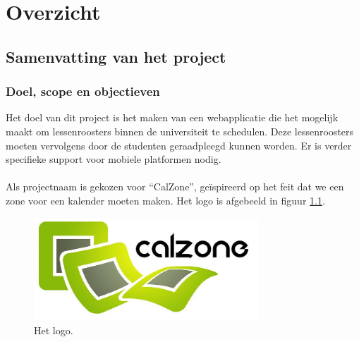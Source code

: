 \chapter{Overzicht}
\section{Samenvatting van het project}
\subsection{Doel, scope en objectieven}
Het doel van dit project is het maken van een webapplicatie die het mogelijk maakt om lessenroosters binnen de universiteit te schedulen. Deze lessenroosters moeten vervolgens door de studenten geraadpleegd kunnen worden. Er is verder specifieke support voor mobiele platformen nodig.
\\
\\
Als projectnaam is gekozen voor ``CalZone'', ge\"{i}spireerd op het feit dat we een zone voor een kalender moeten maken. Het logo is afgebeeld in figuur \ref{fig:logoProject}.
\begin{figure} [H]
    \centering
    \includegraphics[width = 0.75\textwidth]{Overview/logo_Green_Crop.jpg}
    \caption{Het logo.}
    \label{fig:logoProject}
\end{figure}

